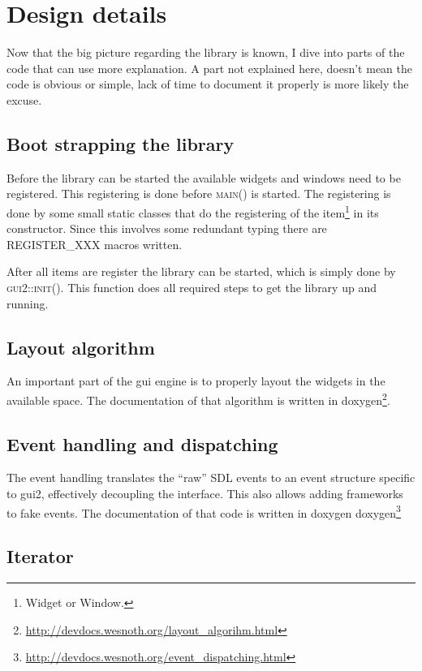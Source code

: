 \chapter{Design details}

Now that the big picture regarding the library is known, I dive into parts of
the code that can use more explanation. A part not explained here, doesn't mean
the code is obvious or simple, lack of time to document it properly is more
likely the excuse.

\section{Boot strapping the library}

Before the library can be started the available widgets and windows need to
be registered. This registering is done before \textsc{main()} is started.
The registering is done by some small static classes that do the registering
of the item\footnote{Widget or Window.} in its constructor. Since this
involves some redundant typing there are REGISTER\_XXX macros written.

After all items are register the library can be started, which is simply
done by \textsc{gui2::init()}. This function does all required steps to get
the library up and running.

\section{Layout algorithm}

An important part of the gui engine is to properly layout the widgets in the
available space. The documentation of that algorithm is written in
doxygen\footnote{\url{http://devdocs.wesnoth.org/layout\_algorihm.html}}.

\section{Event handling and dispatching}
\label{event_handling}

The event handling translates the ``raw'' SDL events to an event structure
specific to gui2, effectively decoupling the interface. This also allows adding
frameworks to fake events. The documentation of that code is written in doxygen
doxygen\footnote{\url{http://devdocs.wesnoth.org/event_dispatching.html}}

\section{Iterator}

